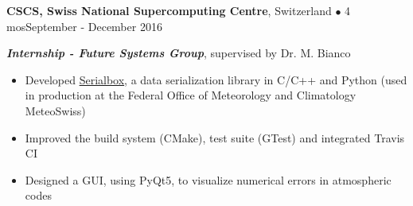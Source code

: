 \textbf{CSCS, Swiss National Supercomputing Centre}, Switzerland $\bullet$ 4 mos\hfill September - December 2016

\textbf{\textit{Internship - Future Systems Group}}, supervised by Dr. M. Bianco

\begin{itemize}
    \item Developed \href{https://github.com/eth-cscs/serialbox2}{Serialbox}, a data serialization library in C/C++ and Python (used in production at the Federal Office of Meteorology and Climatology MeteoSwiss)
	\item Improved the build system (CMake), test suite (GTest) and integrated Travis CI
    \item Designed a GUI, using PyQt5, to visualize numerical errors in atmospheric codes
\end{itemize}
